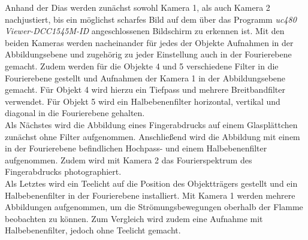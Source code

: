 Anhand der Dias werden zunächst sowohl Kamera 1, als auch Kamera 2 nachjustiert, bis ein möglichst scharfes Bild auf dem über das Programm \textit{uc480 Viewer-DCC1545M-ID} angeschlossenen Bildschirm zu erkennen ist. Mit den beiden Kameras werden nacheinander für jedes der Objekte Aufnahmen in der Abbildungsebene und zugehörig zu jeder Einstellung auch in der Fourierebene gemacht. Zudem werden für die Objekte 4 und 5 verschiedene Filter in die Fourierebene gestellt und Aufnahmen der Kamera 1 in der Abbildungsebene gemacht. Für Objekt 4 wird hierzu ein Tiefpass und mehrere Breitbandfilter verwendet. Für Objekt 5 wird ein Halbebenenfilter horizontal, vertikal und diagonal in die Fourierebene gehalten. \\

Als Nächstes wird die Abbildung eines Fingerabdrucks auf einem Glasplättchen zunächst ohne Filter aufgenommen. Anschließend wird die Abbildung mit einem in der Fourierebene befindlichen Hochpass- und einem Halbebenenfilter aufgenommen. Zudem wird mit Kamera 2 das Fourierspektrum des Fingerabdrucks photographiert. \\

Als Letztes wird ein Teelicht auf die Position des Objektträgers gestellt und ein Halbebenenfilter in der Fourierebene installiert. Mit Kamera 1 werden mehrere Abbildungen aufgenommen, um die Strömungsbewegungen oberhalb der Flamme beobachten zu können. Zum Vergleich wird zudem eine Aufnahme mit Halbebenenfilter, jedoch ohne Teelicht gemacht. 





